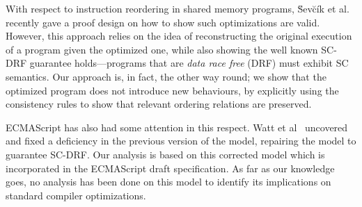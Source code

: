    With respect to instruction reordering in shared memory programs, \u{S}ev\u{c}\'{i}k et al.~\cite{Sevcik2} recently gave a proof design on how to show such optimizations are valid. However, this approach relies on the idea of reconstructing the original execution of a program given the optimized one, while also showing the well known SC-DRF guarantee holds---programs that are \textit{data race free} (DRF) must exhibit SC semantics. Our approach is, in fact, the other way round; we show that the optimized program does not introduce new behaviours, by explicitly using the consistency rules to show that relevant ordering relations are preserved.
   
   ECMAScript has also had some attention in this respect. Watt et al~\cite{WattC} uncovered and fixed a deficiency in the previous version of the model, repairing the model to guarantee SC-DRF. 
   Our analysis is based on this corrected model which is incorporated in the ECMAScript draft specification. As far as our knowledge goes, no analysis has been done on this model to identify its implications on standard compiler optimizations. 